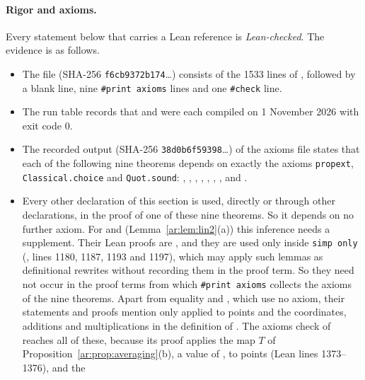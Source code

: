 \paragraph{Rigor and axioms.}
Every statement below that carries a Lean reference is \emph{Lean-checked}. The evidence is as follows.
\begin{itemize}
\item The file  (SHA-256 \texttt{f6cb9372b174}\dots) consists of the 1533
lines of , followed by a blank line, nine \texttt{\#print axioms} lines and one
\texttt{\#check} line.
\item The run table  records that  and
 were each compiled on 1 November 2026 with exit code 0.
\item The recorded output  (SHA-256 \texttt{38d0b6f59398}\dots) of the
axioms file states
that each of the following nine theorems depends on exactly the axioms \texttt{propext}, \texttt{Classical.choice} and
\texttt{Quot.sound}: , ,
, ,
, ,
,  and
.
\item Every other declaration of this section is used, directly or through other declarations, in the proof of one of
these nine theorems. So it depends on no further axiom. For  and 
(Lemma~\ref{ar:lem:lin2}(a)) this inference needs a supplement. Their Lean proofs are , and they are used only inside
\texttt{simp only} (, lines 1180, 1187, 1193 and 1197), which may apply such lemmas as definitional rewrites without
recording them in the proof term. So they need not occur in the proof terms from which \texttt{\#print axioms}
collects the axioms of the nine theorems. Apart from equality and , which use no axiom, their statements and
proofs mention only  applied to points and the coordinates, additions and multiplications in the definition
of . The axioms check of  reaches all of these, because its proof applies
the map $T$ of Proposition~\ref{ar:prop:averaging}(b), a value of , to points (Lean lines 1373--1376), and the

\end{itemize}
